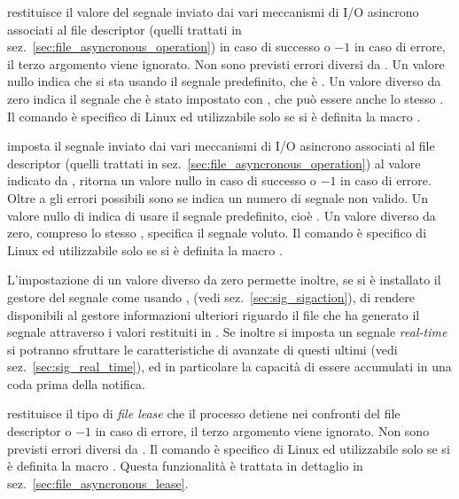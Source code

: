\begin{basedescript}{\desclabelwidth{1.8cm}}
\item[\constd{F\_GETSIG}] restituisce il valore del segnale inviato dai vari
  meccanismi di I/O asincrono associati al file descriptor  (quelli
  trattati in sez.~\ref{sec:file_asyncronous_operation}) in caso di successo o
  $-1$ in caso di errore, il terzo argomento viene ignorato. Non sono previsti
  errori diversi da .  Un valore nullo indica che si sta usando
  il segnale predefinito, che è . Un valore diverso da zero
  indica il segnale che è stato impostato con , che può
  essere anche lo stesso . Il comando è specifico di Linux ed
  utilizzabile solo se si è definita la macro .

\item[\constd{F\_SETSIG}] imposta il segnale inviato dai vari meccanismi di
  I/O asincrono associati al file descriptor  (quelli trattati in
  sez.~\ref{sec:file_asyncronous_operation}) al valore indicato
  da , ritorna un valore nullo in caso di successo o $-1$ in caso
  di errore.  Oltre a  gli errori possibili sono
   se  indica un numero di segnale non valido.  Un
  valore nullo di  indica di usare il segnale predefinito, cioè
  . Un valore diverso da zero, compreso lo stesso
  , specifica il segnale voluto.  Il comando è specifico di
  Linux ed utilizzabile solo se si è definita la macro .

  L'impostazione di un valore diverso da zero permette inoltre, se si è
  installato il gestore del segnale come  usando
  , (vedi sez.~\ref{sec:sig_sigaction}), di rendere
  disponibili al gestore informazioni ulteriori riguardo il file che ha
  generato il segnale attraverso i valori restituiti in
  . Se inoltre si imposta un segnale \textit{real-time} si
  potranno sfruttare le caratteristiche di avanzate di questi ultimi (vedi
  sez.~\ref{sec:sig_real_time}), ed in particolare la capacità di essere
  accumulati in una coda prima della notifica.

\item[\constd{F\_GETLEASE}] restituisce il tipo di \textit{file lease} che il
  processo detiene nei confronti del file descriptor  o $-1$ in caso
  di errore, il terzo argomento viene ignorato. Non sono previsti errori
  diversi da .  Il comando è specifico di Linux ed utilizzabile
  solo se si è definita la macro .  Questa funzionalità è
  trattata in dettaglio in sez.~\ref{sec:file_asyncronous_lease}.


\end{basedescript}
